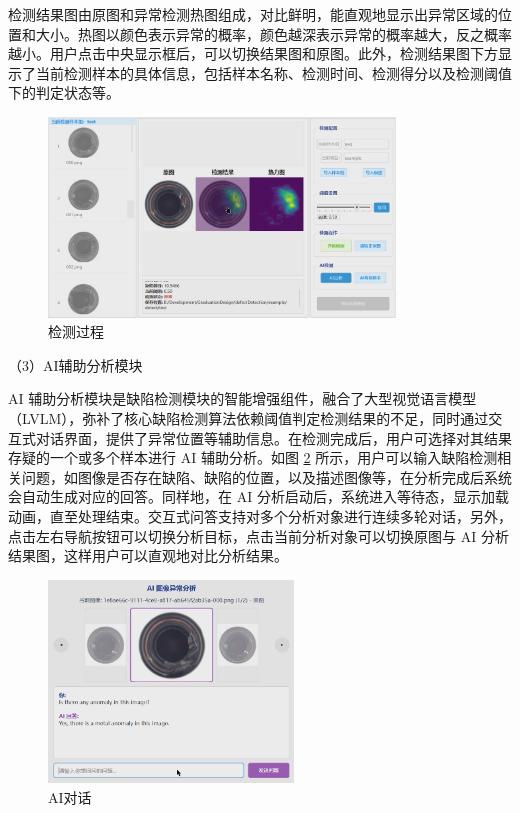 \documentclass[
  ]{njuthesis}
\begin{document}
检测结果图由原图和异常检测热图组成，对比鲜明，能直观地显示出异常区域的位置和大小。热图以颜色表示异常的概率，颜色越深表示异常的概率越大，反之概率越小。用户点击中央显示框后，可以切换结果图和原图。此外，检测结果图下方显示了当前检测样本的具体信息，包括样本名称、检测时间、检测得分以及检测阈值下的判定状态等。

\begin{figure}[htb]
    \centering
    \includegraphics[width=0.82\textwidth]{images/检测过程.png}
    \caption{检测过程}
    \label{检测过程}
\end{figure}

（3）AI辅助分析模块

AI 辅助分析模块是缺陷检测模块的智能增强组件，融合了大型视觉语言模型（LVLM），弥补了核心缺陷检测算法依赖阈值判定检测结果的不足，同时通过交互式对话界面，提供了异常位置等辅助信息。在检测完成后，用户可选择对其结果存疑的一个或多个样本进行 AI 辅助分析。如图 \ref{AI对话} 所示，用户可以输入缺陷检测相关问题，如图像是否存在缺陷、缺陷的位置，以及描述图像等，在分析完成后系统会自动生成对应的回答。同样地，在 AI 分析启动后，系统进入等待态，显示加载动画，直至处理结束。交互式问答支持对多个分析对象进行连续多轮对话，另外，点击左右导航按钮可以切换分析目标，点击当前分析对象可以切换原图与 AI 分析结果图，这样用户可以直观地对比分析结果。

\begin{figure}[H]
    \centering
    \includegraphics[width=0.58\textwidth]{images/AI对话.png}
    \caption{AI对话}
    \label{AI对话}
\end{figure}
\end{document}
